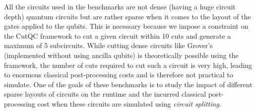 \noindent All the circuits used in the benchmarks are not dense (having a huge circuit depth) quantum circuits but are rather sparse when it comes to the layout of the gates applied to the qubits. This is necessary because we impose a constraint on the CutQC framework to cut a given circuit within 10 cuts and generate a maximum of 5 subcircuits. While cutting dense circuits like Grover's (implemented without using ancilla qubits) is theoretically possible using the framework, the number of cuts required to cut such a circuit is very high, leading to enormous classical post-processing costs and is therefore not practical to simulate. One of the goals of these benchmarks is to study the impact of different sparse layouts of circuits on the runtime and the incurred classical post-processing cost when these circuits are simulated using \textit{circuit splitting}.